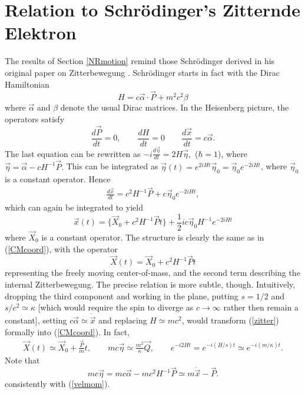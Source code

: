 \documentclass[a4paper,11pt]{article}
\let\ssection=\section
\renewcommand{\section}{\setcounter{equation}{0}\ssection}
\newcommand{\half}{{\scriptstyle{\frac{1}{2}}}}
\newcommand{\vx}{{\vec x}}
\def\vP{{\vec P}}
\def\vQ{{\vec Q}}
\def\valpha{\vec{\alpha}}
\def\veta{\vec{\eta}}
\def\vx{{\vec x}}
\def\vX{{\vec X}}
\begin{document}
\section{Relation to Schr\"odinger's Zitternde Elektron}\label{Zitter}

The results of Section \ref{NRmotion} remind
those  Schr\"odinger derived in his original paper on
Zitterbewegung \cite{Schr}.
Schr\"odinger starts in fact with the Dirac Hamiltonian
\begin{equation}
     H=c\valpha\cdot\vP+m^2c^2\beta
     \label{Dham}
\end{equation}
where $\valpha$ and $\beta$ denote the usual Dirac matrices.
In the Heisenberg picture, the operators satisfy
\begin{equation}
\frac{d\vP}{dt}=0,
\qquad
\frac{dH}{dt}=0
\qquad
\frac{d\vx}{dt}=c\valpha.
\label{Heq}
\end{equation}
The last equation can be rewritten as
$
-i\frac{d\veta}{dt}=2H\veta,
$
($\hbar=1$), where
$
\veta=\valpha-cH^{-1}\vP.
$
This can be integrated as
$\veta(t)=e^{2iHt}\veta_{0}=\veta_{0}e^{-2iHt}$,
where $\veta_{0}$ is a constant operator. Hence
\begin{eqnarray*}
\frac{d\vx}{dt}=c^2H^{-1}\vP+c\veta_{0}e^{-2iHt},
\end{eqnarray*}
which can again be integrated to yield
\begin{equation}
     \vx(t)=
     \big\{\vX_{0}+c^2H^{-1}\vP t\big\}
     +\half ic\vec{\eta}_{0}H^{-1}e^{-2iHt}
     \label{zitter}
\end{equation}
where $\vX_{0}$ is a constant operator.
The structure is clearly the same as in
(\ref{CMcoord}), with the operator
\begin{equation}
     \vX(t)=\vX_{0}+c^2H^{-1}\vP t
\end{equation}
representing the
freely moving center-of-mass, and the second term describing
the internal Zitterbewegung. The precise relation is more subtle,
though.
Intuitively, dropping the third component and working in the plane,
putting $s=1/2$ and $s/c^2\simeq \kappa$ [which would require the
spin to diverge as $c\to\infty$ rather then remain a constant], setting
$c\valpha\simeq \dot{\vx}$ and replacing $H\simeq mc^2$,
would transform (\ref{zitter}) formally into (\ref{CMcoord}). In fact,
\begin{eqnarray}
     \vX(t)\simeq \vX_{0}+\frac{\vP}{m}t,
     \qquad
     mc\veta\simeq\frac{m^2}{\kappa}\vQ,
     \qquad
     e^{-i2Ht}=e^{-i(H/s)t}\simeq e^{-i(m/\kappa)t}.
\end{eqnarray}
Note that
\begin{equation}
     mc\veta=mc\valpha-mc^2H^{-1}\vP\simeq m\dot{\vx}-\vP.
\end{equation}
consistently with (\ref{velmom}).
\end{document}
